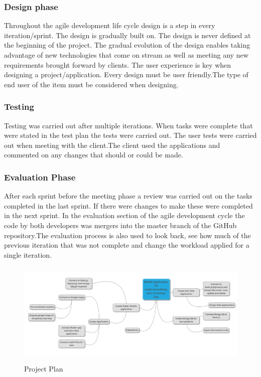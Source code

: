 \subsubsection{Design phase}
Throughout the agile development life cycle design is a step in every iteration/sprint. The design is gradually built on. The design is never defined at the beginning of the project. The gradual evolution of the design enables taking advantage of new technologies that come on stream as well as meeting any new requirements brought forward by clients. The user experience is key when designing a project/application. Every design must be user friendly.The type of end user of the item must be considered when designing.

\subsubsection{Testing}
Testing was carried out after multiple iterations. When tasks were complete that were stated in the test plan the tests were carried out. The user tests were carried out when meeting with the client.The client used the applications and commented on any changes that should or could be made.


\subsubsection{Evaluation Phase}
After each sprint before the meeting phase a review was carried out on the tasks completed in the last sprint. If there were changes to make these were completed in the next sprint. In the evaluation section of the agile development cycle the code by both developers was mergers into the master branch of the GitHub repository.The evaluation process is also used to look back, see how much of the previous iteration that was not complete and change the workload applied for a single iteration.\cite{agile_process}


\begin{figure}[ht]
    \centering
 \includegraphics[width=135mm, height=50mm,scale=0.5]{img/plan.png}
\caption{Project Plan}
\label{fig:Project Plan}
\end{figure}

